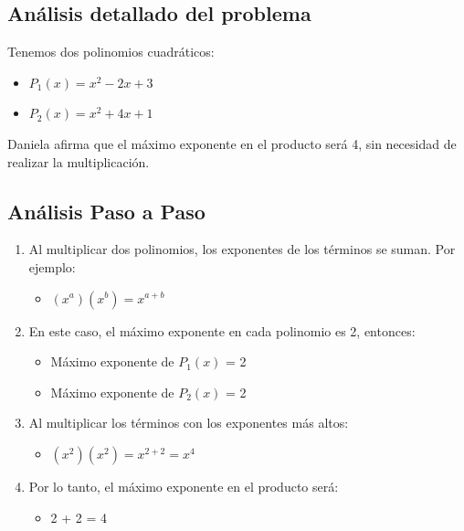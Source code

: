 \documentclass[
]{article}
\providecommand{\tightlist}{%
  \setlength{\itemsep}{0pt}\setlength{\parskip}{0pt}}
\begin{document}
\subsection{Análisis detallado del
problema}\label{anuxe1lisis-detallado-del-problema-11}

Tenemos dos polinomios cuadráticos:

\begin{itemize}
\tightlist
\item
  \(P_1(x) = x^2 - 2x + 3\)
\item
  \(P_2(x) = x^2 + 4x + 1\)
\end{itemize}

Daniela afirma que el máximo exponente en el producto será 4, sin
necesidad de realizar la multiplicación.

\subsection{Análisis Paso a Paso}\label{anuxe1lisis-paso-a-paso}

\begin{enumerate}
\def\labelenumi{\arabic{enumi})}
\tightlist
\item
  Al multiplicar dos polinomios, los exponentes de los términos se
  suman. Por ejemplo:

  \begin{itemize}
  \tightlist
  \item
    \((x^a)(x^b) = x^{a+b}\)
  \end{itemize}
\item
  En este caso, el máximo exponente en cada polinomio es 2, entonces:

  \begin{itemize}
  \tightlist
  \item
    Máximo exponente de \(P_1(x)\) = 2
  \item
    Máximo exponente de \(P_2(x)\) = 2
  \end{itemize}
\item
  Al multiplicar los términos con los exponentes más altos:

  \begin{itemize}
  \tightlist
  \item
    \((x^2)(x^2) = x^{2+2} = x^4\)
  \end{itemize}
\item
  Por lo tanto, el máximo exponente en el producto será:

  \begin{itemize}
  \tightlist
  \item
    2 + 2 = 4
  \end{itemize}
\end{enumerate}
\end{document}
